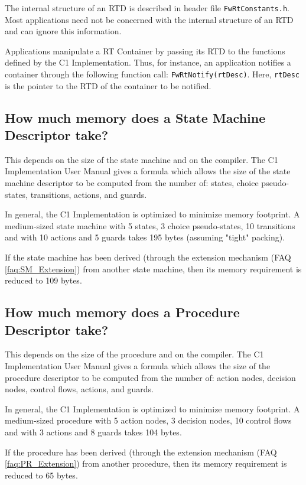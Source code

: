 \documentclass[faq]{../fwprofile}
\begin{document}
The internal structure of an RTD is described in header file \texttt{FwRtConstants.h}. 
Most applications need not be concerned with the internal structure of an RTD and can ignore this information.

Applications manipulate a RT Container by passing its RTD to the functions defined by the C1 Implementation. Thus, for instance, an application notifies a container through the following function call: \texttt{FwRtNotify(rtDesc)}. Here, \texttt{rtDesc} is the pointer to the RTD of the container to be notified.

\subsection{How much memory does a State Machine Descriptor take?}
This depends on the size of the state machine and on the compiler. The C1 Implementation User Manual gives a formula which allows the size of the state machine descriptor to be computed from the number of: states, choice pseudo-states, 
transitions, actions, and guards.

In general, the C1 Implementation is optimized to minimize memory footprint. A medium-sized state machine with 5 states, 3 choice pseudo-states, 
10 transitions and with 10 actions and 5 guards takes 195 bytes (assuming "tight" packing). 
 
If the state machine has been derived (through the extension mechanism (FAQ \ref{faq:SM_Extension}) from another state machine, then its memory requirement 
is reduced to 109 bytes.

\subsection{How much memory does a Procedure Descriptor take?}
This depends on the size of the procedure and on the compiler. The C1 Implementation User Manual gives a formula which allows the size of the procedure descriptor to be computed from the number of: action nodes, decision nodes, control flows, actions, and guards.

In general, the C1 Implementation is optimized to minimize memory footprint. A medium-sized procedure with 5 action nodes, 3 decision nodes, 
10 control flows and with 3 actions and 8 guards takes 104 bytes. 

If the procedure has been derived (through the extension mechanism (FAQ \ref{faq:PR_Extension}) from another procedure, then its memory requirement 
is reduced to 65 bytes.
\end{document}
